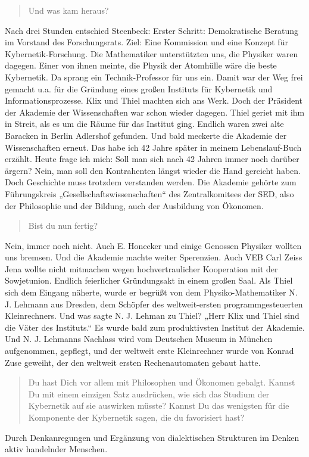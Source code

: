 \documentclass[11pt,a4paper]{article}
\newenvironment{frage}{\begin{quote}}{\end{quote}}
\begin{document}
\begin{frage}
  Und was kam heraus?
\end{frage}
Nach drei Stunden entschied Steenbeck: Erster Schritt: Demokratische Beratung
im Vorstand des Forschungsrats. Ziel: Eine Kommission und eine Konzept für
Kybernetik-Forschung. Die Mathematiker unterstützten uns, die Physiker waren
dagegen. Einer von ihnen meinte, die Physik der Atomhülle wäre die beste
Kybernetik. Da sprang ein Technik-Professor für uns ein. Damit war der Weg
frei gemacht u.a. für die Gründung eines großen Instituts für Kybernetik und
Informationsprozesse. Klix und Thiel machten sich ans Werk. Doch der Präsident
der Akademie der Wissenschaften war schon wieder dagegen. Thiel geriet mit ihm
in Streit, als es um die Räume für das Institut ging. Endlich waren zwei alte
Baracken in Berlin Adlershof gefunden. Und bald meckerte die Akademie der
Wissenschaften erneut. Das habe ich 42 Jahre später in meinem Lebenslauf-Buch
erzählt. Heute frage ich mich: Soll man sich nach 42 Jahren immer noch darüber
ärgern? Nein, man soll den Kontrahenten längst wieder die Hand gereicht haben.
Doch Geschichte muss trotzdem verstanden werden. Die Akademie gehörte zum
Führungskreis „Gesellschaftswissenschaften“ des Zentralkomitees der SED, also
der Philosophie und der Bildung, auch der Ausbildung von Ökonomen.

\begin{frage}
  Bist du nun fertig?	
\end{frage}
Nein, immer noch nicht. Auch E. Honecker und einige Genossen Physiker wollten
uns bremsen. Und die Akademie machte weiter Sperenzien. Auch VEB Carl Zeiss
Jena wollte nicht mitmachen wegen hochvertraulicher Kooperation mit der
Sowjetunion.  Endlich feierlicher Gründungsakt in einem großen Saal. Als Thiel
sich dem Eingang näherte, wurde er begrüßt von dem Physiko-Mathematiker
N. J. Lehmann aus Dresden, dem Schöpfer des weltweit-ersten
programmgesteuerten Kleinrechners. Und was sagte N. J. Lehman zu Thiel? „Herr
Klix und Thiel sind die Väter des Instituts.“ Es wurde bald zum produktivsten
Institut der Akademie. Und N. J. Lehmanns Nachlass wird vom Deutschen Museum
in München aufgenommen, gepflegt, und der weltweit erste Kleinrechner wurde
von Konrad Zuse geweiht, der den weltweit ersten Rechenautomaten gebaut hatte.
\newpage
\begin{frage}
  Du hast Dich vor allem mit Philosophen und Ökonomen gebalgt. Kannst Du mit
  einem einzigen Satz ausdrücken, wie sich das Studium der Kybernetik auf sie
  auswirken müsste? Kannst Du das wenigsten für die Komponente der Kybernetik
  sagen, die du favorisiert hast?
\end{frage}
Durch Denkanregungen und Ergänzung von dialektischen Strukturen im Denken
aktiv handelnder Menschen.
\end{document}
